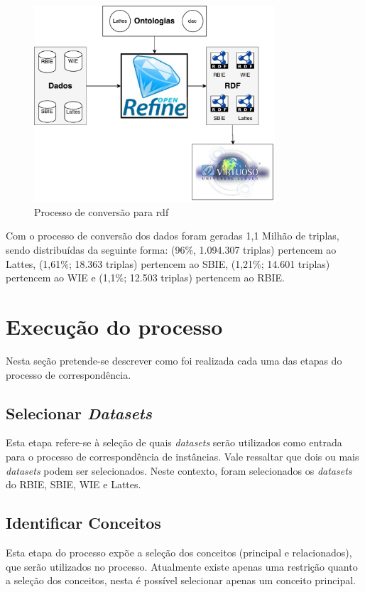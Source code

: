 \begin{figure}[!ht]
	\centering
	\includegraphics[width=0.8\textwidth]{./imagens/conversao.pdf}
	\caption{Processo de conversão para rdf}
	\label{fig:conversao}
\end{figure}

Com o processo de conversão dos dados foram geradas 1,1 Milhão de triplas, sendo distribuídas da seguinte forma: (96\%, 1.094.307 triplas) pertencem ao Lattes, (1,61\%; 18.363 triplas) pertencem ao SBIE, (1,21\%; 14.601 triplas) pertencem ao WIE e (1,1\%; 12.503 triplas) pertencem ao RBIE.

\newpage
\section{Execução do processo}
\label{sec:exec_processo}
Nesta seção pretende-se descrever como foi realizada cada uma das etapas do processo de correspondência. 

\subsection{Selecionar \textit{Datasets}}
\label{sub:selecionar_datasets}
Esta etapa refere-se à seleção de quais \textit{datasets} serão utilizados como entrada para o processo de correspondência de instâncias. Vale ressaltar que dois ou mais \textit{datasets} podem ser selecionados. Neste contexto, foram selecionados os \textit{datasets} do RBIE, SBIE, WIE e Lattes.
  
\subsection{Identificar Conceitos}
Esta etapa do processo expõe a seleção dos conceitos (principal e relacionados), que serão utilizados no processo. Atualmente existe apenas uma restrição quanto a seleção dos conceitos, nesta é possível selecionar apenas um conceito principal.

